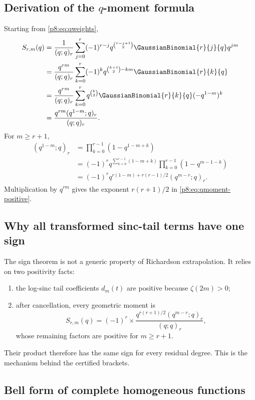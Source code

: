 \documentclass[11pt]{article}
\numberwithin{equation}{section}
\theoremstyle{definition}
\theoremstyle{remark}
\begin{document}
\subsection{Derivation of the \texorpdfstring{$q$}{q}-moment formula}

Starting from \cref{p8:eq:qweights},
\begin{align*}
S_{r,m}(q)
&=\frac{1}{(q;q)_r}
\sum_{j=0}^{r}(-1)^{r-j}
q^{\binom{r-j+1}{2}}\GaussianBinomial{r}{j}{q} q^{jm}\\
&=\frac{q^{rm}}{(q;q)_r}
\sum_{k=0}^{r}(-1)^k q^{\binom{k+1}{2}-km}\GaussianBinomial{r}{k}{q}\\
&=\frac{q^{rm}}{(q;q)_r}
\sum_{k=0}^{r}q^{\binom{k}{2}}\GaussianBinomial{r}{k}{q}
(-q^{1-m})^k\\
&=\frac{q^{rm}(q^{1-m};q)_r}{(q;q)_r}.
\end{align*}
For $m\ge r+1$,
\begin{align*}
(q^{1-m};q)_r
&=\prod_{k=0}^{r-1}(1-q^{1-m+k})\\
&=(-1)^r q^{\sum_{k=0}^{r-1}(1-m+k)}
\prod_{k=0}^{r-1}(1-q^{m-1-k})\\
&=(-1)^r q^{r(1-m)+r(r-1)/2}(q^{m-r};q)_r.
\end{align*}
Multiplication by $q^{rm}$ gives the exponent $r(r+1)/2$ in \cref{p8:eq:qmoment-positive}.

\subsection{Why all transformed sinc-tail terms have one sign}

The sign theorem is not a generic property of Richardson extrapolation. It relies on two positivity facts:
\begin{enumerate}
\item the log-sinc tail coefficients $d_m(t)$ are positive because $\zeta(2m)>0$;
\item after cancellation, every geometric moment is
\[
S_{r,m}(q)=(-1)^r\times
\frac{q^{r(r+1)/2}(q^{m-r};q)_r}{(q;q)_r},
\]
whose remaining factors are positive for $m\ge r+1$.
\end{enumerate}
Their product therefore has the same sign for every residual degree. This is the mechanism behind the certified brackets.

\subsection{Bell form of complete homogeneous functions}
\end{document}
